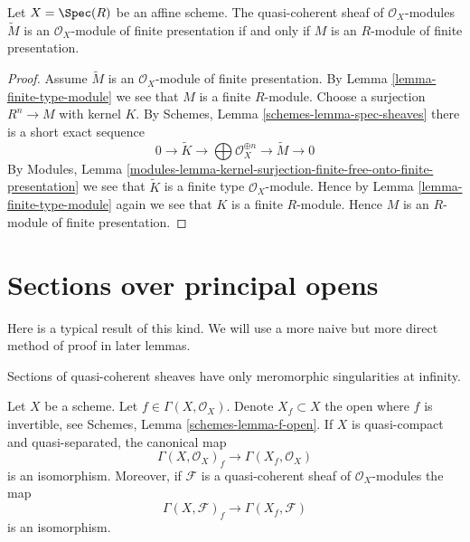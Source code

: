 \begin{lemma}
\label{lemma-finite-presentation-module}
Let $X = \Spec(R)$ be an affine scheme. The quasi-coherent sheaf
of $\mathcal{O}_X$-modules $\widetilde M$ is an $\mathcal{O}_X$-module of
finite presentation if and only if $M$ is an $R$-module of finite presentation.
\end{lemma}

\begin{proof}
Assume $\widetilde M$ is an $\mathcal{O}_X$-module of finite presentation.
By Lemma \ref{lemma-finite-type-module} we see that $M$ is a finite $R$-module.
Choose a surjection $R^n \to M$ with kernel $K$. By
Schemes, Lemma \ref{schemes-lemma-spec-sheaves}
there is a short exact sequence
$$
0 \to \widetilde{K} \to
\bigoplus \mathcal{O}_X^{\oplus n} \to
\widetilde{M} \to 0
$$
By
Modules, Lemma
\ref{modules-lemma-kernel-surjection-finite-free-onto-finite-presentation}
we see that $\widetilde{K}$ is a finite type $\mathcal{O}_X$-module.
Hence by Lemma \ref{lemma-finite-type-module}
again we see that $K$ is a finite $R$-module.
Hence $M$ is an $R$-module of finite presentation.
\end{proof}







\section{Sections over principal opens}
\label{section-principal-opens}

\noindent
Here is a typical result of this kind. We will use a more naive but
more direct method of proof in later lemmas.

\begin{lemma}
\label{lemma-invert-f-sections}
\begin{slogan}
Sections of quasi-coherent sheaves have only meromorphic singularities
at infinity.
\end{slogan}
Let $X$ be a scheme. Let $f \in \Gamma(X, \mathcal{O}_X)$.
Denote $X_f \subset X$ the open where $f$ is invertible, see
Schemes, Lemma \ref{schemes-lemma-f-open}.
If $X$ is quasi-compact and quasi-separated, the canonical map
$$
\Gamma(X, \mathcal{O}_X)_f \longrightarrow \Gamma(X_f, \mathcal{O}_X)
$$
is an isomorphism. Moreover, if $\mathcal{F}$ is a quasi-coherent
sheaf of $\mathcal{O}_X$-modules the map
$$
\Gamma(X, \mathcal{F})_f \longrightarrow \Gamma(X_f, \mathcal{F})
$$
is an isomorphism.
\end{lemma}

